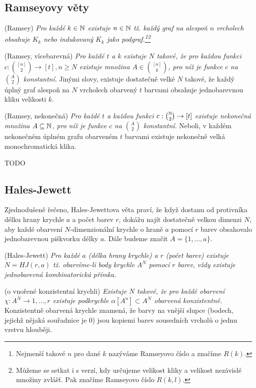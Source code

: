 \subsection{Ramseyovy věty}

\vt (Ramsey) {\it Pro každé $k \in \mathbb{N}$ existuje $n \in \mathbb{N}$ tž. každý graf na alespoň $n$ vrcholech obsahuje $K_k$ nebo indukovaný $\overline{K_k}$ jako podgraf.\footnote{Nejmenší takové $n$ pro dané $k$ nazýváme Ramseyovo číslo a značíme $R(k)$.}\footnote{Můžeme se setkat i s verzí, kdy určujeme velikost kliky a velikost nezávislé množiny zvlášť. Pak značíme Ramseyovo číslo $R(k,l)$.}}

\vt (Ramsey, vícebarevná) {\it Pro každé $t$ a $k$ existuje $N$ takové, že pro každou funkci $c: {[n]\choose 2} \rightarrow [t], n\geq N$ existuje množina $A \in {[n]\choose k}$, pro níž je funkce $c$ na $A\choose 2$ konstantní.} Jinými slovy, existuje dostatečně velké $N$ takové, že každý úplný graf alespoň na $N$ vrcholech obarvený $t$ barvami obsahuje jednobarevnou kliku velikosti $k$.

\vt (Ramsey, nekonečná) {\it Pro každé $t$ a každou funkci $c: {\mathbb{N}\choose 2} \rightarrow [t]$ existuje nekonečná množina $A\subseteq \mathbb{N}$, pro níž je funkce $c$ na $A\choose 2$ konstantní.} Neboli, v každém nekonečném úplném grafu obarveném $t$ barvami existuje nekonečně velká monochromatická klika.

\dk TODO

\subsection{Hales-Jewett}

Zjednodušeně řečeno, Hales-Jewettova věta praví, že když dostanu od protivníka délku hrany krychle $a$ a počet barev $r$, dokážu najít dostatečně velkou dimenzi $N$, aby každé obarvení $N$-dimenzionální krychle o hraně $a$ pomocí $r$ barev obsahovalo jednobarevnou piškvorku délky $a$. Dále budeme značit $A = \{1, \dots, a\}$.

\vt (Hales-Jewett) {\it Pro každé $a$ (délka hrany krychle) a $r$ (počet barev) existuje $N = HJ(r,a)$ tž. obarvíme-li body krychle $A^N$ pomocí $r$ barev, vždy existuje jednobarevná kombinatorická přímka.}

\tv (o vnořené konzistentní krychli) {\it Existuje $N$ takové, že pro každé obarvení $\chi: A^N \rightarrow {1,\dots, r}$ existuje podkrychle $\alpha[A^n] \subset A^N$ obarvená konzistentně.} Konzistentně obarvená krychle znamená, že barvy na vnější slupce (bodech, jejichž nějaká souřadnice je 0) jsou kopiemi barev sousedních vrcholů o jednu vrstvu hlouběji.


